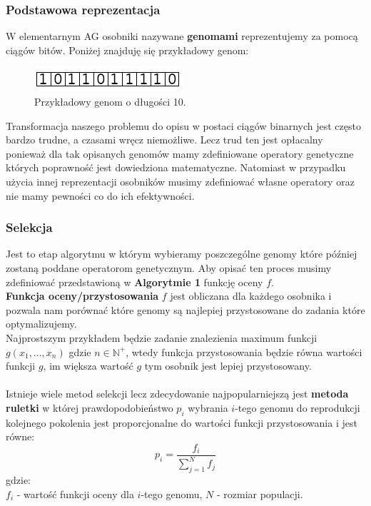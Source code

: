 \documentclass{article}
\begin{document}
\subsubsection{Podstawowa reprezentacja}
W elementarnym AG osobniki nazywane \textbf{genomami} reprezentujemy za pomocą ciągów bitów.
Poniżej znajduję się przykładowy genom:\\

\begin{figure}[H]
\centering
\includegraphics[scale=1.0]{genome.png}
\caption{Przykładowy genom o długości 10.}
\end{figure}

Transformacja naszego problemu do opisu w postaci ciągów binarnych jest często bardzo trudne, a
czasami wręcz niemożliwe. Lecz trud ten jest opłacalny ponieważ dla tak opisanych genomów mamy
zdefiniowane operatory genetyczne których poprawność jest dowiedziona matematyczne. Natomiast w
przypadku użycia innej reprezentacji osobników musimy zdefiniować własne operatory oraz nie mamy
pewności co do ich efektywności.

\subsubsection{Selekcja}
Jest to etap algorytmu w którym wybieramy poszczególne genomy które później zostaną poddane operatorom genetycznym.
Aby opisać ten proces musimy zdefiniować przedstawioną w \textbf{Algorytmie 1} funkcję oceny 
$f$.\\
\textbf{Funkcja oceny/przystosowania} $f$ jest obliczana dla każdego osobnika i pozwala nam
porównać które genomy są najlepiej przystosowane do zadania które optymalizujemy.\\
Najprostszym przykładem będzie zadanie znalezienia maximum funkcji 
$g(x_1, ..., x_n)$ gdzie $n \in \mathbb{N}^{+}$, wtedy funkcja przystosowania
będzie równa wartości funkcji $g$, im większa wartość $g$ tym osobnik jest
lepiej przystosowany.\\\\
Istnieje wiele metod selekcji lecz zdecydowanie najpopularniejszą jest \textbf{metoda ruletki}
w której prawdopodobieństwo $p_i$
wybrania $i$-tego genomu do reprodukcji kolejnego pokolenia jest proporcjonalne do wartości
funkcji przystosowania i jest równe:
\begin{equation}
	p_i = \frac{f_i}{\sum_{j=1}^{N} f_j}
\end{equation}
gdzie:\\
$f_i$ - wartość funkcji oceny dla $i$-tego genomu, $N$ - rozmiar populacji.\\
\end{document}
